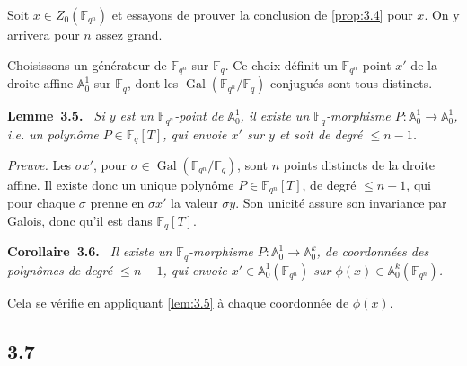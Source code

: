 \documentclass[10pt,a4paper]{article}
\makeatletter
\theoremstyle{plain}
\theoremstyle{definition}
\newenvironment{manualblock}[4]{%
  \par\medskip\noindent\textbf{#1~#2#3.}\def\@currentlabel{#2}\label{#4}\itshape\ }{\par\normalfont\medskip}
\DeclareMathOperator{\Gal}{Gal}
\makeatother
\begin{document}
Soit $x \in Z_0(\mathbb{F}_{q^n})$ et essayons de prouver la conclusion de \ref{prop:3.4} pour $x$. On y arrivera pour $n$ assez grand.

Choisissons un g\'en\'erateur de $\mathbb{F}_{q^n}$ sur $\mathbb{F}_q$. Ce choix d\'efinit un $\mathbb{F}_{q^n}$-point $x'$ de la droite affine $\mathbb{A}_0^1$ sur $\mathbb{F}_q$, dont les $\Gal(\mathbb{F}_{q^n}/\mathbb{F}_q)$-conjugu\'es sont tous distincts.

\begin{manualblock}{Lemme}{3.5}{}{lem:3.5}
Si $y$ est un $\mathbb{F}_{q^n}$-point de $\mathbb{A}_0^1$, il existe un $\mathbb{F}_q$-morphisme $P: \mathbb{A}_0^1 \to \mathbb{A}_0^1$, i.e. un polyn\^ome $P \in \mathbb{F}_q[T]$, qui envoie $x'$ sur $y$ et soit de degr\'e $\leq n-1$.
\end{manualblock}

\noindent\textit{Preuve.} Les $\sigma x'$, pour $\sigma \in \Gal(\mathbb{F}_{q^n}/\mathbb{F}_q)$, sont $n$ points distincts de la droite affine. Il existe donc un unique polyn\^ome $P \in \mathbb{F}_{q^n}[T]$, de degr\'e $\leq n-1$, qui pour chaque $\sigma$ prenne en $\sigma x'$ la valeur $\sigma y$. Son unicit\'e assure son invariance par Galois, donc qu'il est dans $\mathbb{F}_q[T]$.

\begin{manualblock}{Corollaire}{3.6}{}{cor:3.6}
Il existe un $\mathbb{F}_q$-morphisme $P: \mathbb{A}_0^1 \to \mathbb{A}_0^k$, de coordonn\'ees des polyn\^omes de degr\'e $\leq n-1$, qui envoie $x' \in \mathbb{A}_0^1(\mathbb{F}_{q^n})$ sur $\phi(x) \in \mathbb{A}_0^k(\mathbb{F}_{q^n})$.
\end{manualblock}

Cela se v\'erifie en appliquant \ref{lem:3.5} \`a chaque coordonn\'ee de $\phi(x)$.

\subsection*{3.7}
\end{document}

